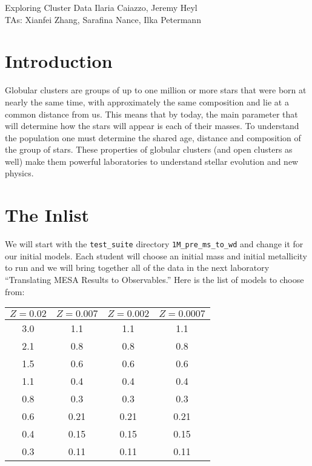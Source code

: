 \documentclass{article}
\begin{document}
\begin{titlebox}{Exploring Cluster Data}
Ilaria Caiazzo, Jeremy Heyl \\
TAs: Xianfei Zhang, Sarafina Nance, Ilka Petermann
\end{titlebox}

\section{Introduction}

Globular clusters are groups of up to one million or more stars that were born at nearly the same time, with approximately the same composition and lie at a common distance from us.  This means that by today, the main parameter that will determine how the stars will appear is each of their masses.  To understand the population one must determine the shared age, distance and composition of the group of stars.   These properties of globular clusters (and open clusters as well) make them powerful laboratories to understand stellar evolution and new physics.

\section{The Inlist}

We will start with the \texttt{test\_suite} directory \texttt{1M\_pre\_ms\_to\_wd} and change it for our initial models.  Each student will choose an initial mass and initial metallicity to run and we will bring together all of the data in the next laboratory ``Translating MESA Results to Observables.''   Here is the list of models to choose from:

\begin{center}
\begin{tabular}{c|ccc}
\hline
$Z=0.02$ &
$Z=0.007$ &
$Z=0.002$ & 
$Z=0.0007$ 
\\  \hline 
3.0 & 1.1 & 1.1 & 1.1  \\
2.1 & 0.8 & 0.8 & 0.8  \\
1.5 & 0.6 & 0.6 & 0.6 \\
1.1 & 0.4 & 0.4 & 0.4  \\
0.8 & 0.3 & 0.3 & 0.3  \\
0.6 & 0.21 & 0.21 & 0.21 \\
0.4 & 0.15 & 0.15 & 0.15 \\
0.3 & 0.11 & 0.11 & 0.11 
\end{tabular}
\end{center}
\end{document}
